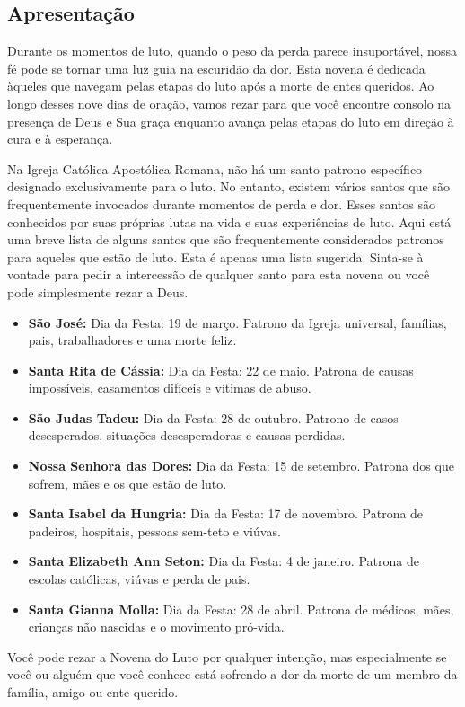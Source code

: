 \documentclass[18pt]{article}
\begin{document}
\begin{justify}

 \begin{center}
  \section{Apresentação}\label{sec:Apresentação} %
 \end{center}


 Durante os momentos de luto, quando o peso da perda parece insuportável, nossa fé pode se tornar uma luz guia na escuridão da dor. Esta novena é dedicada àqueles que navegam pelas etapas do luto após a morte de entes queridos. Ao longo desses nove dias de oração, vamos rezar para que você encontre consolo na presença de Deus e Sua graça enquanto avança pelas etapas do luto em direção à cura e à esperança.

 Na Igreja Católica Apostólica Romana, não há um santo patrono específico designado exclusivamente para o luto. No entanto, existem vários santos que são frequentemente invocados durante momentos de perda e dor. Esses santos são conhecidos por suas próprias lutas na vida e suas experiências de luto. Aqui está uma breve lista de alguns santos que são frequentemente considerados patronos para aqueles que estão de luto. Esta é apenas uma lista sugerida. Sinta-se à vontade para pedir a intercessão de qualquer santo para esta novena ou você pode simplesmente rezar a Deus.

\begin{itemize}
 \item \textbf{São José:} Dia da Festa: 19 de março. Patrono da Igreja universal, famílias, pais, trabalhadores e uma morte feliz.
 \item \textbf{Santa Rita de Cássia:} Dia da Festa: 22 de maio. Patrona de causas impossíveis, casamentos difíceis e vítimas de abuso.
 \item \textbf{São Judas Tadeu:} Dia da Festa: 28 de outubro. Patrono de casos desesperados, situações desesperadoras e causas perdidas.
 \item \textbf{Nossa Senhora das Dores:} Dia da Festa: 15 de setembro. Patrona dos que sofrem, mães e os que estão de luto.
 \item \textbf{Santa Isabel da Hungria:} Dia da Festa: 17 de novembro. Patrona de padeiros, hospitais, pessoas sem-teto e viúvas.
 \item \textbf{Santa Elizabeth Ann Seton:} Dia da Festa: 4 de janeiro. Patrona de escolas católicas, viúvas e perda de pais.
 \item \textbf{Santa Gianna Molla:} Dia da Festa: 28 de abril. Patrona de médicos, mães, crianças não nascidas e o movimento pró-vida.
\end{itemize}

 Você pode rezar a Novena do Luto por qualquer intenção, mas especialmente se você ou alguém que você conhece está sofrendo a dor da morte de um membro da família, amigo ou ente querido.

\end{justify}
\end{document}
